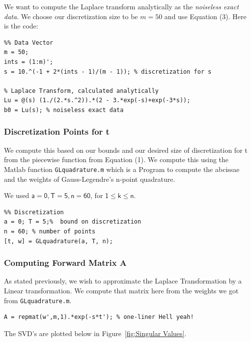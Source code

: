 \documentclass{article}
\begin{document}
We want to compute the Laplace transform analytically as the \textit{noiseless exact data}. We choose our discretization size to be \texttt{$m = 50$} and use Equation (3). Here is the code:

\begin{verbatim}
%% Data Vector
m = 50;
ints = (1:m)';
s = 10.^(-1 + 2*(ints - 1)/(m - 1)); % discretization for s

% Laplace Transform, calculated analytically
Lu = @(s) (1./(2.*s.^2)).*(2 - 3.*exp(-s)+exp(-3*s));
b0 = Lu(s); % noiseless exact data
\end{verbatim}

\subsubsection{Discretization Points for t}

We compute this based on our bounds and our desired size of discretization for t from the piecewise function from Equation (1). We compute this using the Matlab function \texttt{GLquadrature.m} which is a Program to compute the abcissae and the weights of Gauss-Legendre's n-point quadrature.

We used $\mathsf{a = 0, T = 5, n = 60}$, for $\mathsf{1\leq k \leq n}$.

\begin{verbatim}
%% Discretization
a = 0; T = 5;%  bound on discretization
n = 60; % number of points
[t, w] = GLquadrature(a, T, n);
\end{verbatim}

\subsubsection{Computing Forward Matrix A}

As stated previously, we wish to approximate the Laplace Transformation by a Linear transformation. We compute that matrix here from the weights we got from \texttt{GLquadrature.m}.

\begin{verbatim}
A = repmat(w',m,1).*exp(-s*t'); % one-liner Hell yeah!
\end{verbatim}

The SVD's are plotted below in Figure~\ref{fig:Singular Values}.
\end{document}
